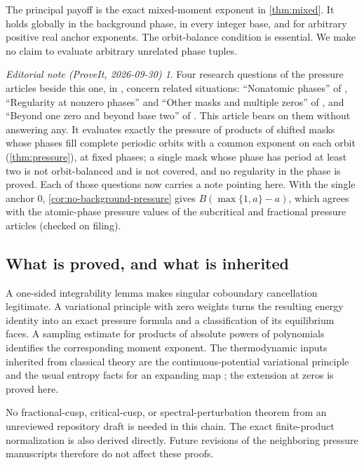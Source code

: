 \documentclass[11pt,a4paper]{article}
\numberwithin{equation}{section}
\theoremstyle{definition}
\theoremstyle{remark}
\newtheorem*{ednote}{Editorial note (ProveIt, 2026-09-30)}
\begin{document}
The principal payoff is the exact mixed-moment exponent in
\cref{thm:mixed}. It holds globally in the background phase, in every
integer base, and for arbitrary positive real anchor exponents. The
orbit-balance condition is essential. We make no claim to evaluate
arbitrary unrelated phase tuples.
\begin{ednote}
Four research questions of the pressure articles beside this one, in
,
concern related situations: ``Nonatomic phases'' of
, ``Regularity at nonzero phases''
and ``Other masks and multiple zeros'' of
, and ``Beyond one zero and beyond
base two'' of . This article bears on
them without answering any. It evaluates exactly the pressure of products
of shifted masks whose phases fill complete periodic orbits with a common
exponent on each orbit (\cref{thm:pressure}), at fixed phases; a single
mask whose phase has period at least two is not orbit-balanced and is not
covered, and no regularity in the phase is proved. Each of those questions now
carries a note pointing here. With the single anchor $0$,
\cref{cor:no-background-pressure} gives $B(\max\{1,a\}-a)$, which agrees
with the atomic-phase pressure values of the subcritical and fractional
pressure articles (checked on filing).
\end{ednote}

\subsection{What is proved, and what is inherited}
A one-sided integrability lemma makes singular coboundary cancellation
legitimate. A variational principle with zero weights turns the resulting
energy identity into an exact pressure formula and a classification of
its equilibrium faces. A sampling estimate for products of absolute
powers of polynomials identifies the corresponding moment exponent.
The thermodynamic inputs inherited from classical theory are the
continuous-potential variational principle and the usual entropy facts
for an expanding map \cite{Walters}; the extension at zeros is proved here.

No fractional-cusp, critical-cusp, or spectral-perturbation theorem from
an unreviewed repository draft is needed in this chain. The exact
finite-product normalization is also derived directly. Future revisions
of the neighboring pressure manuscripts therefore do not affect these
proofs.
\end{document}
